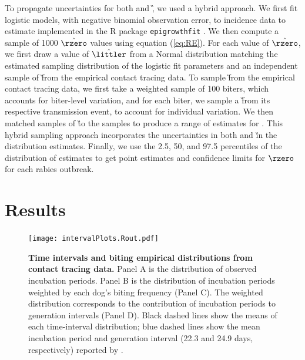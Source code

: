 To propagate uncertainties for both \littler and \G, we used a hybrid approach.
We first fit logistic models, with negative binomial observation error, to incidence data to estimate \littler implemented in the R package {\tt epigrowthfit} \cite{epigrowthfit}.
We then compute a sample of 1000 $\hat{\rzero}$ values using equation (\ref{eq:RE}).
For each value of $\hat{\rzero}$, we first draw a value of $\hat{\littler}$ from a Normal distribution matching the estimated sampling distribution of the logistic fit parameters and an independent sample of \G from the empirical contact tracing data. To sample \G from the empirical contact tracing data, we first take a weighted sample of 100 biters, which accounts for biter-level variation, and for each biter, we sample a \G from its respective transmission event, to account for individual variation.
We then matched samples of \G to the \littler samples to produce a range of estimates for \rzero.
This hybrid sampling approach incorporates the uncertainties in both \littler and \G
in the distribution \rzero estimates.
Finally, we use the 2.5, 50,  and 97.5 percentiles of the distribution of \rzero estimates to get point estimates and confidence limits for $\rzero$ for each rabies outbreak.

\section*{Results}

\begin{center}
\begin{figure}[ht!]
\texttt{[image: intervalPlots.Rout.pdf]}
\caption{\textbf{Time intervals and biting empirical distributions from contact tracing data.}
Panel A is the distribution of observed incubation periods. Panel B is the distribution of incubation periods weighted by each dog's biting frequency (Panel C). The weighted distribution corresponds to the contribution of incubation periods to generation intervals (Panel D).
Black dashed lines show the means of each time-interval distribution; blue dashed lines show the mean incubation period and generation interval (22.3 and 24.9 days, respectively) reported by \cite{hampson2009transmission}.
}
\end{figure}
\end{center}

\FloatBarrier


